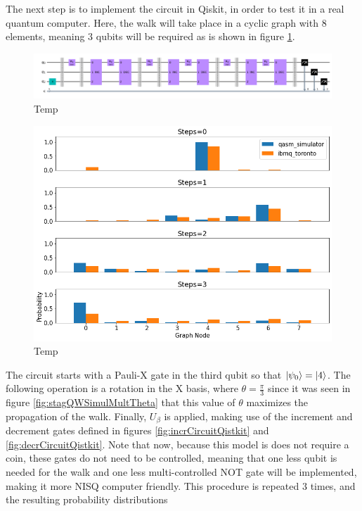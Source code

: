 \documentclass[../../dissertation.tex]{subfiles}
\begin{document}
The next step is to implement the circuit in Qiskit, in order to test it in a real quantum computer. Here, the walk will take place in a cyclic graph with $8$ elements, meaning 3 qubits will be required as is shown in figure \ref{fig:stagQWCircuitQistkit}.
\begin{figure}[!h]
	\centering
	\includegraphics[scale=0.32]{img/Qiskit/StaggeredQW/Circuits/circStagQW_N3_S3.png}
	\caption{Temp} 
	\label{fig:stagQWCircuitQistkit}
\end{figure}\par
\begin{figure}[!h]
	\centering
	\includegraphics[scale=0.40]{img/Qiskit/StaggeredQW/StagQW_N3_S0123.png}
	\caption{Temp} 
	\label{fig:stagQWQiskitDist}
\end{figure}
The circuit starts with a Pauli-X gate in the third qubit so that $\ket{\psi_0}
= \ket{4}$. The following operation is a rotation in the X basis, where $\theta
= \frac{\pi}{3}$ since it was seen in figure \ref{fig:stagQWSimulMultTheta}
that this value of $\theta$ maximizes the propagation of the walk. Finally,
$U_\beta$ is applied, making use of the increment and decrement gates defined
in figures \ref{fig:incrCircuitQistkit} and \ref{fig:decrCircuitQistkit}. Note that now, because this model is does not require a coin, these gates do not need to be controlled, meaning that one less qubit is needed for the walk and one less multi-controlled NOT gate will be implemented, making it more NISQ computer friendly. This procedure is repeated $3$ times, and the resulting probability distributions
\end{document}
